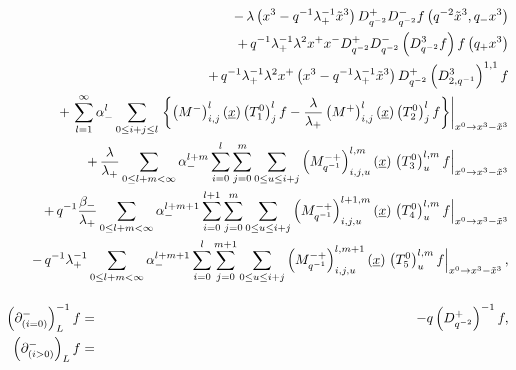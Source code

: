 \documentclass[a4paper,11pt,oneside]{article}
\begin{document}
\begin{eqnarray}
&&\hspace{-2cm}-\,\lambda \left( x^{3}-q^{-1}\lambda _{+}^{-1}\tilde{x}%
^{3}\right) D_{q^{-2}}^{+}D_{q^{-2}}^{-}f\left( q^{-2}\tilde{x}%
^{3},q_{-}x^{3}\right)  \nonumber \\
&&\hspace{-2cm}+\,q^{-1}\lambda _{+}^{-1}\lambda
^{2}x^{+}x^{-}D_{q^{-2}}^{+}D_{q^{-2}}^{-}\left( D_{q^{-2}}^{3}f\right)
f\left( q_{+}x^{3}\right)  \nonumber \\
&&\hspace{-2cm}+\,q^{-1}\lambda _{+}^{-1}\lambda ^{2}x^{+}\left(
x^{3}-q^{-1}\lambda _{+}^{-1}\tilde{x}^{3}\right) D_{q^{-2}}^{+}\left(
D_{2,q^{-1}}^{3}\right) ^{1,1}f  \nonumber \\
&&\hspace{-2cm}+\,\sum_{l=1}^{\infty }\alpha _{-}^{l}\sum_{0\leq i+j\leq
l}\left.\left\{ \left( M^{-}\right) _{i,j}^{l}\left( \underline{x}\right)
 \left(T^0_1\right)^l_jf-\frac{\lambda }{\lambda _{+}}\left( M^{+}\right)
_{i,j}^{l}\left( \underline{x}\right) \left(T^0_2\right)^l_jf\right\}\right|
_{x^{0}\rightarrow x^{3}-\tilde{x}^{3}}  \nonumber \\
&&\hspace{-2cm}+\,\frac{\lambda }{\lambda _{+}}\sum_{0\leq l+m<\infty
}\alpha _{-}^{l+m}\sum_{i=0}^{l}\sum_{j=0}^{m}\sum_{0\leq u\leq i+j}\left(
M_{q^{-1}}^{-+}\right) _{i,j,u}^{l,m}\left( \underline{x}\right) \left.\left(T^0_3\right)^{l,m}_uf \right| _{x^{0}\rightarrow x^{3}-\tilde{x}^{3}} 
\nonumber \\
&&\hspace{-2cm}+\,q^{-1}\frac{\beta_-}{\lambda_+}  \sum_{0\leq
l+m<\infty }\alpha _{-}^{l+m+1}\sum_{i=0}^{l+1}\sum_{j=0}^{m}\sum_{0\leq
u\leq i+j}\left( M_{q^{-1}}^{-+}\right) _{i,j,u}^{l+1,m}\left( \underline{x}%
\right)\left.\left(T^0_4\right)^{l,m}_uf 
\right| _{x^{0}\rightarrow x^{3}-\tilde{x}%
^{3}}  \nonumber \\
&&\hspace{-2cm}-\,q^{-1}\lambda _{+}^{-1}\sum_{0\leq l+m<\infty }\alpha
_{-}^{l+m+1}\sum_{i=0}^{l}\sum_{j=0}^{m+1}\sum_{0\leq u\leq i+j}\left(
M_{q^{-1}}^{-+}\right) _{i,j,u}^{l,m+1}\left( \underline{x}\right) 
\left. \left(T^0_5\right)^{l,m}_uf \right| _{x^{0}\rightarrow x^{3}-\tilde{x}^{3}}, 
\nonumber \\[0.16in]
\left( \partial _{\left( i=0\right) }^{-}\right) _{L}^{-1}f &=&-q\left(
D_{q^{-2}}^{+}\right) ^{-1}f, \\
\left( \partial _{\left( i>0\right) }^{-}\right) _{L}f &=&\nonumber\\

\end{eqnarray}
\end{document}
